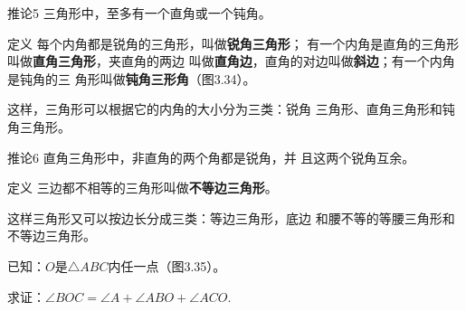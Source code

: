 \begin{blk}
    {推论5 }三角形中，至多有一个直角或一个钝角。
\end{blk}

\begin{blk}
   {定义} 每个内角都是锐角的三角形，叫做\textbf{锐角三角形}；
有一个内角是直角的三角形叫做\textbf{直角三角形}，夹直角的两边
叫做\textbf{直角边}，直角的对边叫做\textbf{斜边}；有一个内角是钝角的三
角形叫做\textbf{钝角三形角}（图3.34）。
\end{blk}

\begin{figure}[htp]
    \centering
{}
    \caption{}
\end{figure}

这样，三角形可以根据它的内角的大小分为三类：锐角
三角形、直角三角形和钝角三角形。

\begin{blk}
{推论6} 直角三角形中，非直角的两个角都是锐角，并
且这两个锐角互余。
\end{blk}

\begin{blk}
{定义}
三边都不相等的三角形叫做\textbf{不等边三角形}。
\end{blk}

这样三角形又可以按边长分成三类：等边三角形，底边
和腰不等的等腰三角形和不等边三角形。


\begin{example}
    已知：$O$是$\triangle ABC$内任一点（图3.35）。

求证：$\angle BOC=\angle A+\angle ABO+\angle ACO$.
\end{example}

